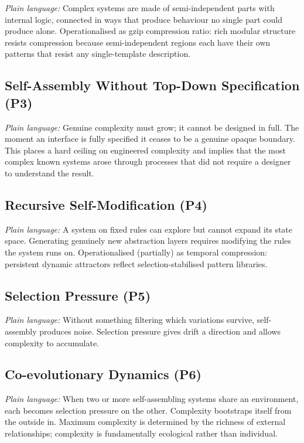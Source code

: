 \documentclass[12pt,a4paper]{article}
\begin{document}
\textit{Plain language:} Complex systems are made of semi-independent
parts with internal logic, connected in ways that produce behaviour no
single part could produce alone.
Operationalised as gzip compression ratio: rich modular structure
resists compression because semi-independent regions each have their
own patterns that resist any single-template description.

\subsection{Self-Assembly Without Top-Down Specification (P3)}

\textit{Plain language:} Genuine complexity must grow; it cannot be
designed in full.
The moment an interface is fully specified it ceases to be a genuine
opaque boundary.
This places a hard ceiling on engineered complexity and implies that
the most complex known systems arose through processes that did not
require a designer to understand the result.

\subsection{Recursive Self-Modification (P4)}

\textit{Plain language:} A system on fixed rules can explore but
cannot expand its state space.
Generating genuinely new abstraction layers requires modifying the
rules the system runs on.
Operationalised (partially) as temporal compression: persistent
dynamic attractors reflect selection-stabilised pattern libraries.

\subsection{Selection Pressure (P5)}

\textit{Plain language:} Without something filtering which variations
survive, self-assembly produces noise.
Selection pressure gives drift a direction and allows complexity to
accumulate.

\subsection{Co-evolutionary Dynamics (P6)}

\textit{Plain language:} When two or more self-assembling systems share
an environment, each becomes selection pressure on the other.
Complexity bootstraps itself from the outside in.
Maximum complexity is determined by the richness of external
relationships; complexity is fundamentally ecological rather than
individual.
\end{document}
